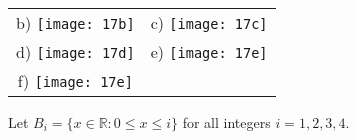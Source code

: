 \documentclass[12pt,letterpaper, onecolumn]{exam}
\begin{document}
\begin{questions}
	\begin{solution}\\
	\begin{tabular}{cc}
		b) \texttt{[image: 17b]} & c) \texttt{[image: 17c]} \\
		d) \texttt{[image: 17d]} & e) \texttt{[image: 17e]} \\
		f) \texttt{[image: 17e]} & \\
	\end{tabular}
	\end{solution}
	\setcounter{question}{19}\question Let $B_i=\{x\in\mathbb{R}:0\leq x\leq i\}$ for all integers $i=1,2,3,4.$
	\begin{solution}
\end{solution}
\end{questions}
\end{document}
